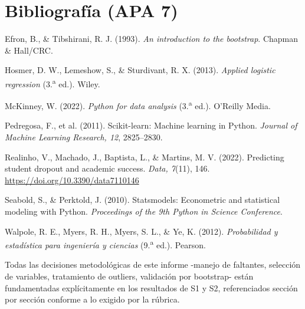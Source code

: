 \documentclass[11pt,a4paper]{article}
\begin{document}
\section{Bibliografía (APA 7)}

Efron, B., \& Tibshirani, R. J. (1993). \emph{An introduction to the bootstrap}. Chapman \& Hall/CRC.

Hosmer, D. W., Lemeshow, S., \& Sturdivant, R. X. (2013). \emph{Applied logistic regression} (3.\textsuperscript{a} ed.). Wiley.

McKinney, W. (2022). \emph{Python for data analysis} (3.\textsuperscript{a} ed.). O'Reilly Media.

Pedregosa, F., et al. (2011). Scikit-learn: Machine learning in Python. \emph{Journal of Machine Learning Research, 12}, 2825--2830.

Realinho, V., Machado, J., Baptista, L., \& Martins, M. V. (2022). Predicting student dropout and academic success. \emph{Data, 7}(11), 146. \url{https://doi.org/10.3390/data7110146}

Seabold, S., \& Perktold, J. (2010). Statsmodels: Econometric and statistical modeling with Python. \emph{Proceedings of the 9th Python in Science Conference}.

Walpole, R. E., Myers, R. H., Myers, S. L., \& Ye, K. (2012). \emph{Probabilidad y estadística para ingeniería y ciencias} (9.\textsuperscript{a} ed.). Pearson.

\begin{infobox}[Trazabilidad S1 $\to$ S2 $\to$ S3]
Todas las decisiones metodológicas de este informe -manejo de faltantes, selección de variables,
tratamiento de outliers, validación por bootstrap- están fundamentadas explícitamente en los
resultados de S1 y S2, referenciados sección por sección conforme a lo exigido por la rúbrica.
\end{infobox}
\end{document}
